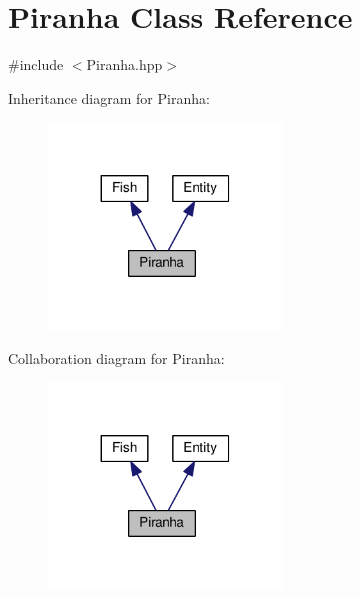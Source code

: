 \hypertarget{classPiranha}{}\section{Piranha Class Reference}
\label{classPiranha}


{\ttfamily \#include $<$Piranha.\+hpp$>$}



Inheritance diagram for Piranha\+:\nopagebreak
\begin{figure}[H]
\begin{center}
\leavevmode
\includegraphics[width=176pt]{classPiranha__inherit__graph}
\end{center}
\end{figure}


Collaboration diagram for Piranha\+:\nopagebreak
\begin{figure}[H]
\begin{center}
\leavevmode
\includegraphics[width=176pt]{classPiranha__coll__graph}
\end{center}
\end{figure}
